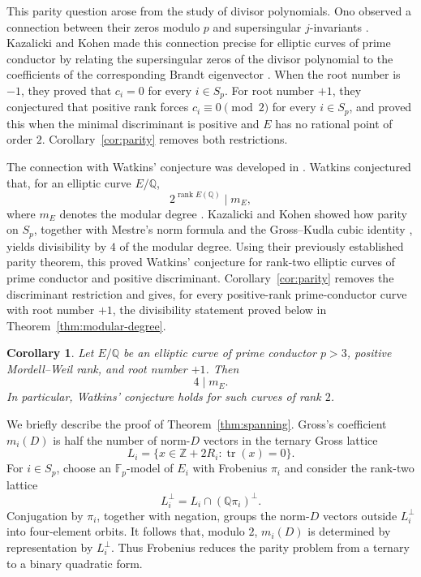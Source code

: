 \documentclass[11pt]{amsart}
\newtheorem{corollary}[theorem]{Corollary}
\theoremstyle{definition}
\theoremstyle{remark}
\newcommand{\Q}{\mathbb{Q}}
\newcommand{\F}{\mathbb{F}}
\begin{document}
This parity question arose from the study of divisor polynomials. Ono observed a connection between their zeros modulo $p$ and supersingular $j$-invariants \cite[p.~118]{Ono2004}. Kazalicki and Kohen made this connection precise for elliptic curves of prime conductor by relating the supersingular zeros of the divisor polynomial to the coefficients of the corresponding Brandt eigenvector \cite{KazalickiKohen2017}. When the root number is $-1$, they proved that $c_i=0$ for every $i\in S_p$. For root number $+1$, they conjectured that positive rank forces $c_i\equiv0\pmod2$ for every $i\in S_p$, and proved this when the minimal discriminant is positive and $E$ has no rational point of order $2$. Corollary~\ref{cor:parity} removes both restrictions.

The connection with Watkins' conjecture was developed in \cite{KazalickiKohen2018,KazalickiKohenCorrigendum2019}. Watkins conjectured that, for an elliptic curve $E/\Q$,
\[
  2^{\operatorname{rank}E(\Q)}\mid m_E,
\]
where $m_E$ denotes the modular degree \cite[Conjecture~4.1]{Watkins2002}. Kazalicki and Kohen showed how parity on $S_p$, together with Mestre's
norm formula \cite[Section~3, formula~(5), Theorem~3.2]{Mestre1986} and
the Gross--Kudla cubic identity
\cite[Corollary~11.5]{GrossKudla1992}, yields divisibility by $4$ of the
modular degree. Using their previously established parity theorem, this proved Watkins'
conjecture for rank-two elliptic curves of prime conductor and positive
discriminant. Corollary~\ref{cor:parity} removes the discriminant restriction and gives,
for every positive-rank prime-conductor curve with root number $+1$,
the divisibility statement proved below in
Theorem~\ref{thm:modular-degree}.

\begin{corollary}
Let $E/\Q$ be an elliptic curve of prime conductor $p>3$, positive Mordell--Weil rank, and root number $+1$. Then
\[
  4\mid m_E.
\]
In particular, Watkins' conjecture holds for such curves of rank $2$.
\end{corollary}



We briefly describe the proof of Theorem~\ref{thm:spanning}. Gross's
coefficient $m_i(D)$ is half the number of norm-$D$ vectors in the ternary
Gross lattice
\[
  L_i=\{x\in\mathbb Z+2R_i:\operatorname{tr}(x)=0\}.
\]
For $i\in S_p$, choose an $\F_p$-model of $E_i$ with Frobenius $\pi_i$ and
consider the rank-two lattice
\[
  L_i^\perp=L_i\cap(\Q\pi_i)^\perp.
\]
Conjugation by $\pi_i$, together with negation, groups the norm-$D$ vectors
outside $L_i^\perp$ into four-element orbits. It follows that, modulo $2$,
$m_i(D)$ is determined by representation by $L_i^\perp$. Thus Frobenius
reduces the parity problem from a ternary to a binary quadratic form.
\end{document}
